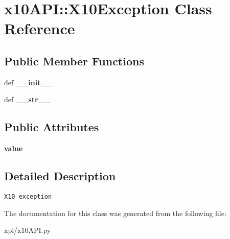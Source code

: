 \hypertarget{classx10API_1_1X10Exception}{
\section{x10API::X10Exception Class Reference}
\label{classx10API_1_1X10Exception}
}
\subsection*{Public Member Functions}
\begin{CompactItemize}
\item 
\hypertarget{classx10API_1_1X10Exception_033a895f90bdb03c500be02471701831}{
def \textbf{\_\-\_\-init\_\-\_\-}}
\label{classx10API_1_1X10Exception_033a895f90bdb03c500be02471701831}

\item 
\hypertarget{classx10API_1_1X10Exception_a9a0adf2ba11276fecd3d7d0f759a8c9}{
def \textbf{\_\-\_\-str\_\-\_\-}}
\label{classx10API_1_1X10Exception_a9a0adf2ba11276fecd3d7d0f759a8c9}

\end{CompactItemize}
\subsection*{Public Attributes}
\begin{CompactItemize}
\item 
\hypertarget{classx10API_1_1X10Exception_ea0d93a4bd33db7e6f416fe28d739c84}{
\textbf{value}}
\label{classx10API_1_1X10Exception_ea0d93a4bd33db7e6f416fe28d739c84}

\end{CompactItemize}


\subsection{Detailed Description}


\footnotesize\begin{verbatim}
X10 exception
\end{verbatim}
\normalsize
 

The documentation for this class was generated from the following file:\begin{CompactItemize}
\item 
xpl/x10API.py\end{CompactItemize}
